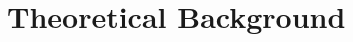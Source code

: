 \documentclass{article}
\begin{document}


\section{Theoretical Background}\label{theory}
\end{document}
